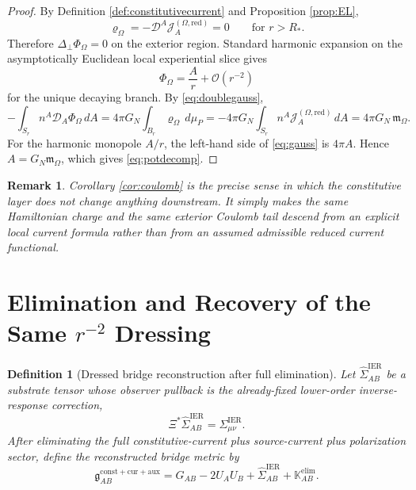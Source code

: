 \documentclass[11pt]{article}
\newcommand{\BridgeMetric}{\mathfrak g}
\newcommand{\ObserverMap}{\Xi}
\newcommand{\SpatialD}{\mathcal D}
\newcommand{\LapPerp}{\Delta_\perp}
\newcommand{\FlowPot}{\Phi_\Omega}
\newcommand{\SourceDensity}{\varrho_\Omega}
\newcommand{\SourceCurrentRed}{\mathcal J^{(\Omega,\mathrm{red})}}
\newcommand{\HamChargeOmega}{\mathfrak m_\Omega}
\newcommand{\SigmaIER}{\Sigma^{\mathrm{IER}}}
\newcommand{\LiftIER}{\widehat\Sigma^{\mathrm{IER}}}
\newcommand{\AuxPol}{\mathbb K}
\newtheorem{definition}{Definition}
\newtheorem{remark}{Remark}
\begin{document}
\begin{proof}
By Definition \ref{def:constitutivecurrent} and Proposition \ref{prop:EL},
\[
\SourceDensity
=
-\SpatialD^A\SourceCurrentRed_A
=
0
\qquad
\text{for } r>R_\ast.
\]
Therefore \(\LapPerp\FlowPot=0\) on the exterior region. Standard harmonic expansion on the asymptotically Euclidean local experiential slice gives
\[
\FlowPot=\frac{A}{r}+\mathcal O(r^{-2})
\]
for the unique decaying branch. By \eqref{eq:doublegauss},
\begin{equation}
-\int_{S_r}n^A\SpatialD_A\FlowPot\,dA
=
4\pi G_N\int_{B_r}\SourceDensity\,d\mu_P
=
-4\pi G_N\int_{S_r}n^A\SourceCurrentRed_A\,dA
=
4\pi G_N\,\HamChargeOmega.
\label{eq:gauss}
\end{equation}
For the harmonic monopole \(A/r\), the left-hand side of \eqref{eq:gauss} is \(4\pi A\). Hence \(A=G_N\HamChargeOmega\), which gives \eqref{eq:potdecomp}.
\end{proof}

\begin{remark}
Corollary \ref{cor:coulomb} is the precise sense in which the constitutive layer does not change anything downstream. It simply makes the same Hamiltonian charge and the same exterior Coulomb tail descend from an explicit local current formula rather than from an assumed admissible reduced current functional.
\end{remark}

\section{Elimination and Recovery of the Same \texorpdfstring{\(r^{-2}\)}{r^-2} Dressing}

\begin{definition}[Dressed bridge reconstruction after full elimination]
\label{def:bridge}
Let \(\LiftIER_{AB}\) be a substrate tensor whose observer pullback is the already-fixed lower-order inverse-response correction,
\begin{equation}
\ObserverMap^\ast\LiftIER_{AB}=\SigmaIER_{\mu\nu}.
\label{eq:liftier}
\end{equation}
After eliminating the full constitutive-current plus source-current plus polarization sector, define the reconstructed bridge metric by
\begin{equation}
\BridgeMetric_{AB}^{\mathrm{const+cur+aux}}
=
G_{AB}
-2U_AU_B
+\LiftIER_{AB}
+\AuxPol_{AB}^{\mathrm{elim}}.
\label{eq:bridge}
\end{equation}
\end{definition}
\end{document}
